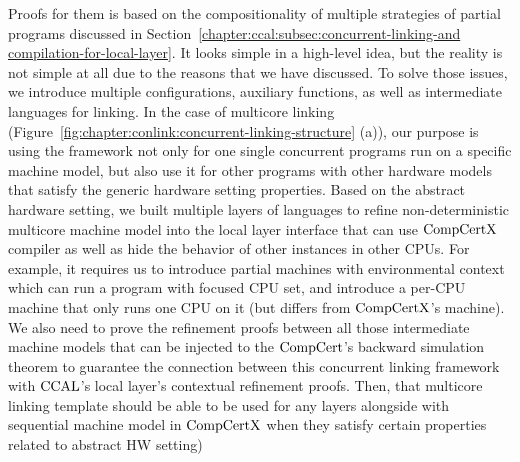 Proofs for them is based on the compositionality of multiple strategies 
of partial programs discussed in Section~\ref{chapter:ccal:subsec:concurrent-linking-and compilation-for-local-layer}.   
It looks simple in a high-level idea, but the reality is not simple at all
due to the reasons that we have discussed. 
To solve those issues, 
we introduce multiple configurations, auxiliary functions, as well as intermediate languages for linking. 
In the case of multicore linking (Figure~\ref{fig:chapter:conlink:concurrent-linking-structure} (a)),
our purpose is using the framework not only for one single concurrent programs run on a specific machine model, 
but also use it for other programs with other hardware models that satisfy the generic hardware setting properties. 
Based on the abstract hardware setting, 
we built multiple layers of languages to refine non-deterministic multicore machine model 
into the local layer interface that can use $\mathrm{CompCertX}$ compiler as well as 
hide the behavior of other instances in other CPUs.
For example, 
it requires us to introduce partial machines with environmental context which can run a program with focused CPU set, 
and introduce a per-CPU machine that only runs one CPU on it (but differs from $\mathrm{CompCertX}$'s machine). 
We also need to prove the refinement proofs between all those intermediate machine models
that can be injected to the $\mathrm{CompCert}$'s backward simulation theorem to guarantee the connection between this concurrent linking framework with $\mathrm{CCAL}$'s local layer's contextual refinement proofs. 
Then, that multicore linking template should be able to be used for any layers alongside with sequential machine model in $\mathrm{CompCertX}$ when they satisfy certain properties related to abstract HW setting)

